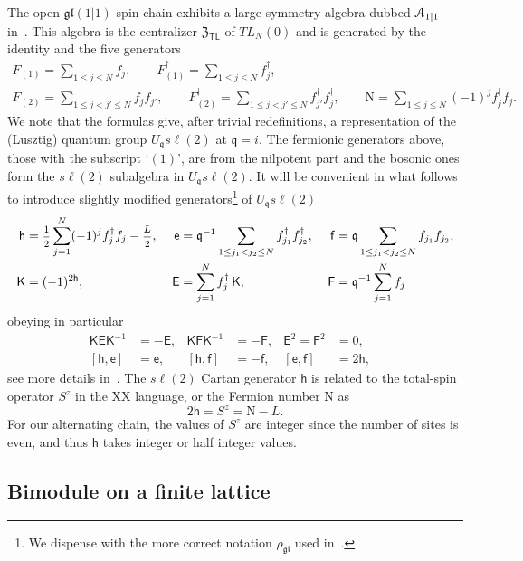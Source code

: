 \documentclass[11pt]{article}
\newcommand{\q}{\mathfrak{q}}
\newcommand{\ffrac}[2]{\mbox{\footnotesize$\displaystyle\frac{#1}{#2}$}}
\newcommand{\TL}[1]{TL_{#1}}
\newcommand{\LQG}{U_{\q} s\ell(2)}
\newcommand{\K}{\mathsf{K}}
\newcommand{\F}{\mathsf{F}}
\newcommand{\f}{\mathsf{f}}
\newcommand{\E}{\mathsf{E}}
\newcommand{\h}{\mathsf{h}}
\newcommand{\e}{\mathsf{e}}
\newcommand{\half}{%
  \mathchoice{\ffrac{1}{2}}{\frac{1}{2}}{\frac{1}{2}}{\frac{1}{2}}}
\newcommand{\gl}{\mathfrak{gl}}
\newcommand{\repQG}{\rho_{\gl}}
\newcommand{\cent}{\mathfrak{Z}}
\newcommand{\centTL}{\cent_{\mathsf{TL}}}
\newcommand{\N}{\mathrm N}
\theoremstyle{definition}
\begin{document}
\medskip
The open $\gl(1|1)$ spin-chain exhibits a large symmetry algebra
dubbed ${\cal A}_{1|1}$ in~\cite{ReadSaleur07-1}. This algebra is the
centralizer $\centTL$ of $\TL{N}(0)$ and is
generated by the identity and the five generators
\begin{gather}
F_{(1)}=\sum_{1\leq j\leq N} f_j,\qquad
F^\dagger_{(1)}=\sum_{1\leq j\leq N} f_j^\dagger,\label{F1-def}\\
F_{(2)}=\sum_{1\leq j<j'\leq N}f_jf_{j'},\qquad
F_{(2)}^\dagger=\sum_{1\leq j<j'\leq N} f_{j'}^\dagger f_j^\dagger,\qquad
{\N}=\sum_{1\leq j\leq N} (-1)^jf_j^\dagger f_j.\label{F2-def}
\end{gather}
We note that the formulas give, after trivial redefinitions, a
representation of the (Lusztig) quantum group $\LQG$ at $\q=i$. The fermionic
generators above, those with the subscript `$(1)$', are from the nilpotent part and the
bosonic ones form the $s\ell(2)$ subalgebra in $\LQG$. It will be
convenient in what follows to introduce slightly modified generators\footnote{We
dispense with the more correct notation $\repQG$ used in~\cite{GRS1}.} of $\LQG$
%
\begin{align}
\h&=\half\sum_{j=1}^{N} (-1)^jf_j^\dagger f_j-\ffrac{L}{2},\;
&\e &= \q^{-1}\sum_{1\leq j_1<j_2\leq N}f_{j_1}^\dagger f_{j_2}^\dagger,\;
&\f &= \q\sum_{1\leq j_1<j_2\leq N}f_{j_1}f_{j_2},\label{QG-ferm-2}\\
\K&=(-1)^{2\h},\;
&\E& = \sum_{j=1}^N f_j^\dagger\,\K,\;
&\F &= \q^{-1}\sum_{j=1}^N f_j\label{QG-ferm-1}
\end{align}
%
obeying in particular
%
\begin{align}
 \K\E\K^{-1}&=-\E,&
  \K\F\K^{-1}&=-\F,&
  \E^{2}=\F^{2}&=0,&\\
[\h,\e]&=\e,& [\h,\f]&=-\f,& [\e,\f]&=2\h,&
\end{align}
%
see more details in~\cite{GRS1}.
The $s\ell(2)$ Cartan generator $\h$ is related to the total-spin operator $S^z$  in the XX language, or the Fermion number $\N$ as
%
\begin{equation}
2\h=S^z=\N-L.
\end{equation}
%
For our alternating chain, the values of $S^z$ are integer since the
number of sites is even, and thus $\h$ takes integer or half integer
values.


\subsection{Bimodule on a finite lattice}
\end{document}
